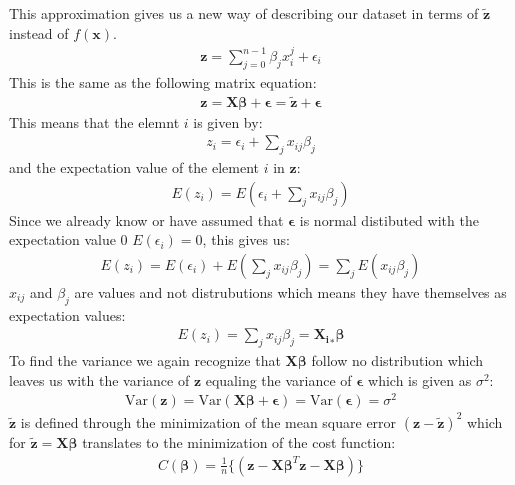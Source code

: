 \documentclass[norsk,a4paper,11pt]{scrartcl}
\begin{document}
This approximation gives us a new way of describing our dataset in terms of $\boldsymbol{\tilde{z}}$ instead of $f(\boldsymbol{x})$.
\begin{align*}
  \boldsymbol{z} = \sum_{j=0}^{n-1}\beta_jx_i^j + \epsilon_i
\end{align*}
This is the same as the following matrix equation:
\begin{align*}
  \boldsymbol{z} = \boldsymbol{X}\boldsymbol{\beta} + \boldsymbol{\epsilon} = \boldsymbol{\tilde{z}} + \boldsymbol{\epsilon}
\end{align*}
This means that the elemnt $i$ is given by:
\begin{align*}
  z_i = \epsilon_i + \sum_j x_{ij}\beta_j
\end{align*}
and the expectation value of the element $i$ in $\boldsymbol{z}$:
\begin{align*}
  E(z_i) = E(\epsilon_i + \sum_j x_{ij}\beta_j)
\end{align*}
Since we already know or have assumed that $\boldsymbol{\epsilon}$ is normal distibuted with the expectation value 0 $E(\epsilon_i)=0$, this gives us:
\begin{align*}
  E(z_i) = E(\epsilon_i) + E(\sum_j x_{ij}\beta_j) = \sum_jE(x_{ij}\beta_j)
\end{align*}
$x_{ij}$ and $\beta_j$ are values and not distrubutions which means they have themselves as expectation values:
\begin{align*}
    E(z_i) = \sum_jx_{ij}\beta_j = \boldsymbol{X_i}_*\boldsymbol{\beta}
\end{align*}
To find the variance we again recognize that $\boldsymbol{X}\boldsymbol{\beta}$ follow no distribution which leaves us with the variance of $\boldsymbol{z}$ equaling the variance of $\boldsymbol{\epsilon}$ which is given as $\sigma^2$:
\begin{align*}
  \text{Var}(\boldsymbol{z}) = \text{Var}(\boldsymbol{X}\boldsymbol{\beta} + \boldsymbol{\epsilon}) = \text{Var}(\boldsymbol{\epsilon}) = \sigma^2
\end{align*}
$\boldsymbol{\tilde{z}}$ is defined through the minimization of the mean square error $(\boldsymbol{z} - \boldsymbol{\tilde{z}})^2$ which for $\boldsymbol{\tilde{z}} = \boldsymbol{X}\boldsymbol{\beta}$ translates to the minimization of the cost function:
\begin{align*}
  C(\boldsymbol{\beta}) = \frac{1}{ n}\{(\boldsymbol{z}- \boldsymbol{X}\boldsymbol{\beta}^T\boldsymbol{z}- \boldsymbol{X}\boldsymbol{\beta})\}
\end{align*}
\end{document}
